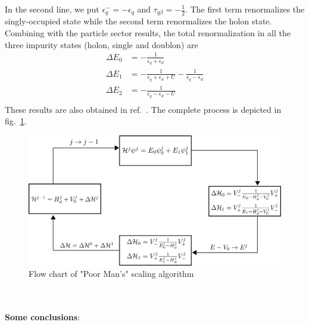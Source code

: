 \documentclass[twoside,11pt]{report}
\numberwithin{equation}{section}
\begin{document}
In the second line, we put \(\epsilon^-_q = -\epsilon_q\) and \(\tau_{q\beta} = -\frac{1}{2}\). The first term renormalizes the singly-occupied state while the second term renormalizes the holon state. Combining with the particle sector results, the total renormalization in all the three impurity states (holon, single and doublon) are
\begin{equation}\begin{aligned}
\Delta E_0 &= -\frac{1}{\epsilon_q + \epsilon_d}\\
\Delta E_1 &= -\frac{1}{\epsilon_q + \epsilon_d + U} - \frac{1}{\epsilon_q - \epsilon_d}\\
\Delta E_2 &= -\frac{1}{\epsilon_q - \epsilon_d - U}\\
\end{aligned}\end{equation}
These results are also obtained in ref.~\cite{hewson}. The complete process is depicted in fig.~\ref{pmsflow}.
\begin{figure}
    \centering
    \includegraphics[scale=0.34]{pms-flowchart.png}
    \caption{Flow chart of "Poor Man's" scaling algorithm}
    \label{pmsflow}
\end{figure}
\\\\\textbf{Some conclusions}:
\end{document}
